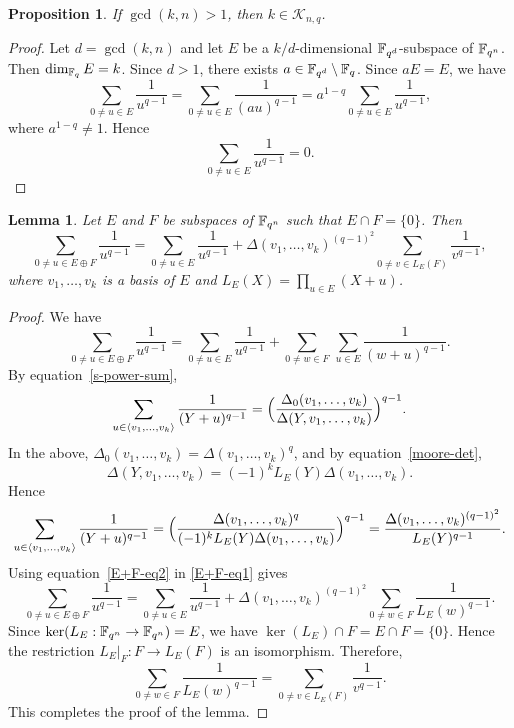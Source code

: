 \documentclass{amsart}
\newtheorem{lem}[thm]{Lemma}
\newtheorem{prop}[thm]{Proposition}
\numberwithin{equation}{section}
\theoremstyle{definition}
\newcommand{\f}{\Bbb F}
\begin{document}
\begin{prop}\label{gcd}
If $\gcd(k,n)>1$, then $k\in\mathcal K_{n,q}$.
\end{prop}

\begin{proof}
Let $d=\gcd(k,n)$ and let $E$ be a $k/d$-dimensional $\f_{q^d}$-subspace of $\f_{q^n}$. Then $\dim_{\f_q}E=k$. Since $d>1$, there exists $a\in\f_{q^d}\setminus\f_q$. Since $aE=E$, we have
\[
\sum_{0\ne u\in E}\frac 1{u^{q-1}}=\sum_{0\ne u\in E}\frac 1{(au)^{q-1}}=a^{1-q}\sum_{0\ne u\in E}\frac 1{u^{q-1}},
\]
where $a^{1-q}\ne 1$. Hence 
\[
\sum_{0\ne u\in E}\frac 1{u^{q-1}}=0.
\]
\end{proof}


\begin{lem}\label{E+F-q-ary}
Let $E$ and $F$ be subspaces of $\f_{q^n}$ such that $E\cap F=\{0\}$. Then
\begin{equation}\label{E+F-q}
\sum_{0\ne u\in E\oplus F}\frac 1{u^{q-1}}=\sum_{0\ne u\in E}\frac 1{u^{q-1}}+\Delta(v_1,\dots,v_k)^{(q-1)^2}\sum_{0\ne v\in L_E(F)}\frac 1{v^{q-1}},
\end{equation}
where $v_1,\dots,v_k$ is a basis of $E$ and $L_E(X)=\prod_{u\in E}(X+u)$.
\end{lem}

\begin{proof}
We have
\begin{equation}\label{E+F-eq1}
\sum_{0\ne u\in E\oplus F}\frac 1{u^{q-1}}=\sum_{0\ne u\in E}\frac 1{u^{q-1}}+\sum_{0\ne w\in F}\,\sum_{u\in E}\frac 1{(w+u)^{q-1}}.
\end{equation}
By equation~\eqref{s-power-sum},
\[
\sum_{u\in\langle v_1,\dots,v_k\rangle}\frac 1{(Y+u)^{q-1}}=\Bigl(\frac{\Delta_0(v_1,\dots,v_k)}{\Delta(Y,v_1,\dots,v_k)}\Bigr)^{q-1}.
\]
In the above, $\Delta_0(v_1,\dots,v_k)=\Delta(v_1,\dots,v_k)^q$, and by equation~\eqref{moore-det},
\[
\Delta(Y,v_1,\dots,v_k)=(-1)^k L_E(Y)\Delta(v_1,\dots,v_k).
\]
Hence
\begin{equation}\label{E+F-eq2}
\sum_{u\in\langle v_1,\dots,v_k\rangle}\frac 1{(Y+u)^{q-1}}=\Bigl(\frac{\Delta(v_1,\dots,v_k)^q}{(-1)^k L_E(Y)\Delta(v_1,\dots,v_k)}\Bigr)^{q-1}=\frac{\Delta(v_1,\dots,v_k)^{(q-1)^2}}{L_E(Y)^{q-1}}.
\end{equation}
Using equation~\eqref{E+F-eq2} in \eqref{E+F-eq1} gives
\[
\sum_{0\ne u\in E\oplus F}\frac 1{u^{q-1}}=\sum_{0\ne u\in E}\frac 1{u^{q-1}}+\Delta(v_1,\dots,v_k)^{(q-1)^2}\sum_{0\ne w\in F}\frac 1{L_E(w)^{q-1}}.
\]
Since $\ker(L_E:\f_{q^n}\to\f_{q^n})=E$, we have $\ker(L_E)\cap F=E\cap F=\{0\}$. Hence the restriction $L_E|_F:F\to L_E(F)$ is an isomorphism. Therefore,
\[
\sum_{0\ne w\in F}\frac1{L_E(w)^{q-1}}=\sum_{0\ne v\in L_E(F)}\frac 1{v^{q-1}}.
\]
This completes the proof of the lemma.
\end{proof}
\end{document}
